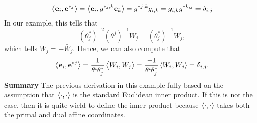 \documentclass[11pt]{article}
\begin{document}
\begin{example}
$$
\left\langle \mathbf{e}_i,\mathbf{e}^{*j}\right\rangle=\left\langle \mathbf{e}_i,g^{*j,k}\mathbf{e}_k\right\rangle=g^{*j,k}g_{i,k}=g_{i,k}g^{*k,j}=\delta_{i,j}
$$
In our example, this tells that
$$
(\theta_j^*)^{-2}(\theta^j)^{-1}W_j=(\theta_j^*)^{-1}\bar W_j,
$$
which tells $W_j=-\bar W_j$. Hence, we can also compute that
$$
\left\langle \mathbf{e}_i,\mathbf{e}^{*j}\right\rangle=\frac{1}{\theta^i\theta_j^*}\left\langle W_i,\bar W_j\right\rangle=\frac{-1}{\theta^i\theta_j^*}\left\langle W_i,W_j\right\rangle=\delta_{i,j}.
$$
\textbf{Summary} The previous derivation in this example fully based on the assumption that $\left\langle \cdot,\cdot\right\rangle$ is the standard Euclidean inner product. If this is not the case, then it is quite wield to define the inner product because $\left\langle \cdot,\cdot\right\rangle$ takes both the primal and dual affine coordinates.
\end{example}


\printbibliography
\end{document}
